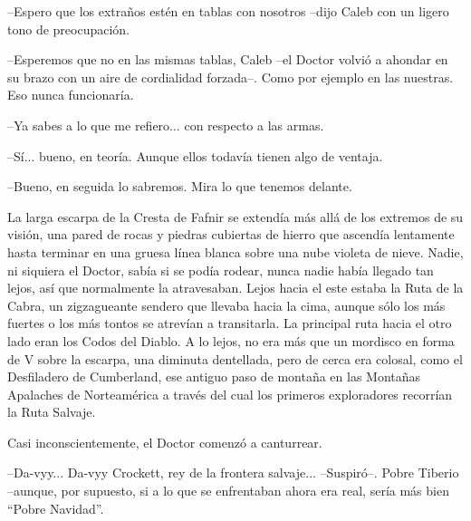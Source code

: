 --Espero que los extraños estén en tablas con nosotros --dijo Caleb con un ligero tono de preocupación.
 
--Esperemos que no en las mismas tablas, Caleb --el Doctor volvió a ahondar en su brazo con un aire de cordialidad forzada--. Como por ejemplo en las nuestras. Eso nunca funcionaría.
 
--Ya sabes a lo que me refiero... con respecto a las armas.
 
--Sí... bueno, en teoría. Aunque ellos todavía tienen algo de ventaja.
 
--Bueno, en seguida lo sabremos. Mira lo que tenemos delante.
 
La larga escarpa de la Cresta de Fafnir se extendía más allá de los extremos de su visión, una pared de rocas y piedras cubiertas de hierro que ascendía lentamente hasta terminar en una gruesa línea blanca sobre una nube violeta de nieve. Nadie, ni siquiera el Doctor, sabía si se podía rodear, nunca nadie había llegado tan lejos,  así que normalmente la atravesaban. Lejos hacia el este estaba la Ruta de la Cabra, un zigzagueante sendero que llevaba hacia la cima, aunque sólo los más fuertes o los más tontos se atrevían a transitarla. La principal ruta hacia el otro lado eran los Codos del Diablo. A lo lejos, no era más que un mordisco en forma de V sobre la escarpa, una diminuta dentellada, pero de cerca era colosal, como el Desfiladero de Cumberland, ese antiguo paso de montaña en las Montañas Apalaches de Norteamérica a través del cual los primeros exploradores recorrían la Ruta Salvaje.
 
Casi inconscientemente, el Doctor comenzó a canturrear.
 
--Da-vyy... Da-vyy Crockett, rey de la frontera salvaje... --Suspiró--. Pobre Tiberio --aunque, por supuesto, si a lo que se enfrentaban ahora era real, sería más bien ``Pobre Navidad''.
